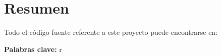\chapter*{Resumen}



Todo el código fuente referente a este proyecto puede encontrarse en:


\vspace{10mm}

\textbf{Palabras clave: }r